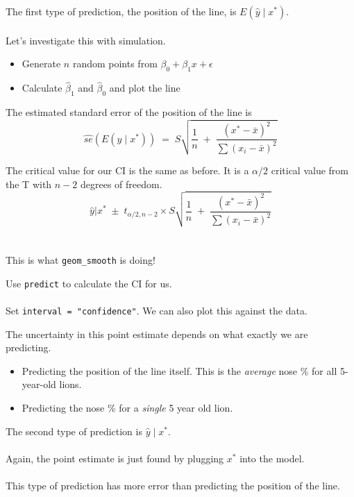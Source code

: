\documentclass[xcolor={dvipsnames,svgnames},14pt]{beamer}
\begin{document}
\begin{frame}
The first type of prediction, the position of the line, is $E(\hat{y} \;|\; x^*)$. \\~\\

Let's investigate this with simulation. \begin{itemize}
\item Generate $n$ random points from $\beta_0 + \beta_1 x + \epsilon$ 
\item Calculate $\hat{\beta}_1$ and $\hat{\beta}_0$ and plot the line
\end{itemize}
\end{frame}

\begin{frame}
The estimated standard error of the position of the line is
$$\hat{se}(E(\hat{y} \;|\; x^*)) \;=\; S \sqrt{\frac{1}{n} \;+\; \frac{(x^* - \bar{x})^2}{\sum(x_i - \bar{x})^2}}$$ 
\end{frame}

\begin{frame}
The critical value for our CI is the same as before.  It is a $\alpha/2$ critical value from the T with $n-2$ degrees of freedom.
$$\hat{y}|x^* \;\pm\; t_{\alpha/2, n-2} \times S \sqrt{\frac{1}{n} \;+\; \frac{(x^* - \bar{x})^2}{\sum(x_i - \bar{x})^2}} $$ \\~\\
This is what \texttt{geom\_smooth} is doing!
\end{frame}

\begin{frame}
Use \texttt{predict} to calculate the CI for us. \\~\\

Set \texttt{interval = "confidence"}.  We can also plot this against the data.
\end{frame}

\begin{frame}
The uncertainty in this point estimate depends on what exactly we are predicting.  \begin{itemize}
\item Predicting the position of the line itself.  This is the \textit{average} nose \% for all 5-year-old lions. 
\item Predicting the nose \% for a \textit{single} 5 year old lion.
\end{itemize}
\end{frame}

\begin{frame}
The second type of prediction is $\hat{y} \;|\; x^*$. \\~\\

Again, the point estimate is just found by plugging $x^*$ into the model. \\~\\

This type of prediction has more error than predicting the position of the line.
\end{frame}
\end{document}
